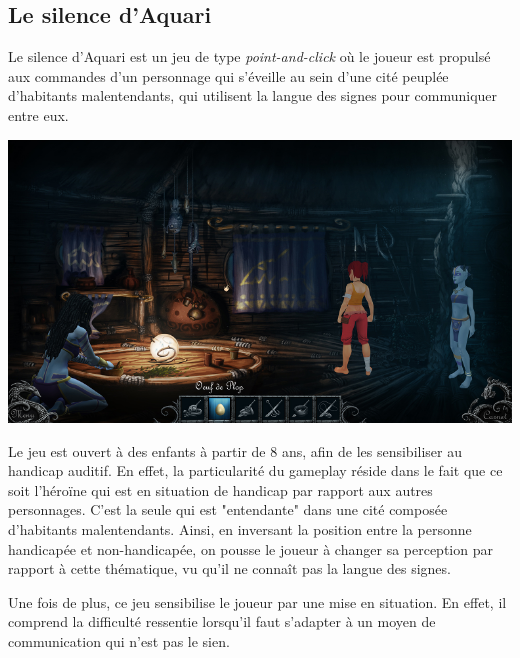\documentclass[a4paper,11pt]{article}
\begin{document}
\subsection{Le silence d'Aquari}

Le silence d'Aquari est un jeu de type \textit{point-and-click} où le joueur est propulsé aux commandes d’un personnage qui s’éveille au sein d’une cité peuplée d’habitants malentendants, qui utilisent la langue des signes pour communiquer entre eux.

\begin{center}
\includegraphics[scale=0.35]{./fig/jeu3.png}
\end{center}

Le jeu est ouvert à des enfants à partir de 8 ans, afin de les sensibiliser au handicap auditif. En effet, la particularité du gameplay réside dans le fait que ce soit l’héroïne qui est en situation de handicap par rapport aux autres personnages. C’est la seule qui est "entendante" dans une cité composée d’habitants malentendants. Ainsi, en inversant la position entre la personne handicapée et non-handicapée, on pousse le joueur à changer sa perception par rapport à cette thématique, vu qu’il ne connaît pas la langue des signes.

Une fois de plus, ce jeu sensibilise le joueur par une mise en situation. En effet, il comprend la difficulté ressentie lorsqu’il faut s’adapter à un moyen de communication qui n’est pas le sien.
\end{document}
